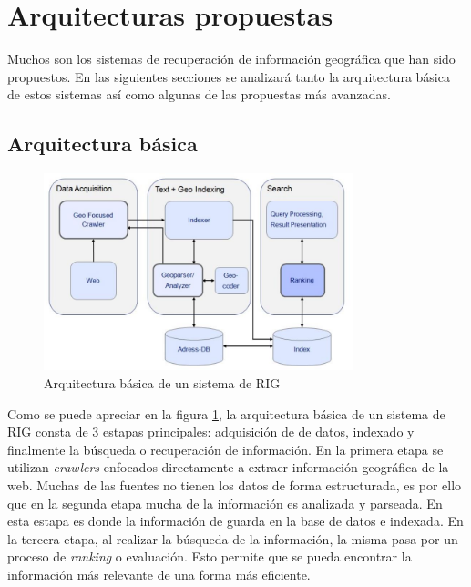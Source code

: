 \section{Arquitecturas propuestas}\label{sec:arch}

Muchos son los sistemas de recuperación de información geográfica que han sido
propuestos. En las siguientes secciones se analizará tanto la arquitectura
básica de estos sistemas así como algunas de las propuestas más avanzadas.

\subsection{Arquitectura básica}\label{sec:archbas}

\begin{figure}[htb]%
	\begin{center}
		\includegraphics[width=0.8\textwidth]{basic_arch.jpg}
	\end{center}
	\caption{Arquitectura básica de un sistema de RIG \cite{cai2011}}
	\label{fig:archbas}
\end{figure}

Como se puede apreciar en la figura \ref{fig:archbas}, la arquitectura básica
de un sistema de RIG consta de 3 estapas principales: adquisición de de datos,
indexado y finalmente la búsqueda o recuperación de información. En la primera
etapa se utilizan \emph{crawlers} enfocados directamente a extraer información
geográfica de la web. Muchas de las fuentes no tienen los datos de forma
estructurada, es por ello que en la segunda etapa mucha de la información es
analizada y parseada. En esta estapa es donde la información de guarda en la
base de datos e indexada. En la tercera etapa, al realizar la búsqueda de la
información, la misma pasa por un proceso de \emph{ranking} o evaluación. Esto
permite que se pueda encontrar la información más relevante de una forma más
eficiente.

